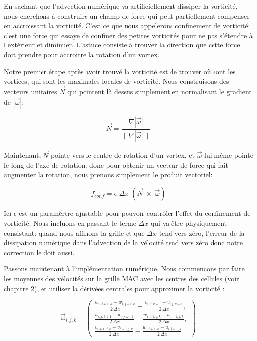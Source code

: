 \documentclass[11pt]{report}
\begin{document}
En sachant que l'advection numérique va artificiellement dissiper la vorticité, nous cherchons à construire un champ de force qui peut partiellement compenser en accroissant la vorticité. C'est ce que nous appelerons confinement de vorticité: c'est une force qui essaye de confiner des petites vorticités pour ne pas s'étendre à l'extérieur et diminuer. L'astuce consiste à trouver la direction que cette force doit prendre pour accroitre la rotation d'un vortex.\newline

Notre premier étape après avoir trouvé la vorticité est de trouver où sont les vortices, qui sont les maximales locales de vorticité. Nous construisons des vecteurs unitaires $\overrightarrow{N}$ qui pointent là dessus simplement en normalisant le gradient de $ |\overrightarrow{\omega}|$:

\begin{equation}
\overrightarrow{N} = \frac{\nabla |\overrightarrow{\omega}|}{\| \nabla |\overrightarrow{\omega}| \|}
\end{equation}

Maintenant, $\overrightarrow{N}$ pointe vers le centre de rotation d'un vortex, et $\overrightarrow{\omega}$ lui-même pointe le long de l'axe de rotation, donc pour obtenir un vecteur de force qui fait augmenter la rotation, nous prenons simplement le produit vectoriel:

\begin{equation}
f_{conf} = \epsilon \,\, \Delta x \,\, (\overrightarrow{N} \,\, \times \,\, \overrightarrow{\omega})
\end{equation}

Ici $\epsilon$ est un paramèrtre ajustable pour pouvoir contrôler l'effet du confinement de vorticité. Nous incluons en passant le terme $\Delta x$ qui va être physiquement consistant: quand nous affinons la grille et que $\Delta x$ tend vers zéro, l'erreur de la dissipation numérique dans l'advection de la vélocité tend vers zéro donc notre correction le doit aussi.\newline

Passons maintenant à l'implémentation numérique. Nous commencons par faire les moyennes des vélocités sur la grille MAC avec les centres des cellules (voir chapitre 2), et utiliser la dérivées centrales pour approximer la vorticité :

\begin{equation}
\overrightarrow{\omega}_{i,j,k} = 
	\left(
		\begin{array}{c}
			\frac{w_{i,j+1,k} - w_{i,j-1,k}}{2\,\Delta x} - \frac{v_{i,j,k+1} - v_{i,j,k-1}}{2\,\Delta x}, \\
			\frac{u_{i,j,k+1} - u_{i,j,k-1}}{2\,\Delta x} - \frac{w_{i+1,j,k} - w_{i-1,j,k}}{2\,\Delta x}, \\
	 		\frac{v_{i+1,j,k} - v_{i-1,j,k}}{2\,\Delta x} - \frac{u_{i,j+1,k} - u_{i,j-1,k}}{2\,\Delta x}
		\end{array}
	\right)
\end{equation}
\end{document}
